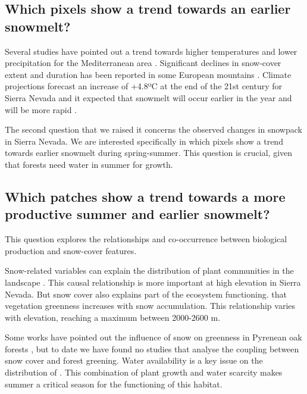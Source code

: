 \subsection{Which pixels show a trend towards an earlier snowmelt?}\label{sec:onto:Snowmelt}

Several studies have pointed out a trend towards higher temperatures and lower precipitation for the Mediterranean area \autocite{GarciaRuizetal2011MediterraneanWater,GiorgiLionello2008ClimateChange}. Significant declines in snow-cover extent and duration has been reported in some European mountains \autocite{Marty2008RegimeShift,MorenoRodriguezetal2005EvaluacionPreliminar,Nikolovaetal2013ChangesSnowfall,Scherreretal2004TrendsSwiss}. Climate projections forecast an increase of +4.8ºC at the end of the 21st century \autocite{Benitoetal2011SimulatingPotential} for Sierra Nevada and it expected that snowmelt will occur earlier in the year and will be more rapid \autocite{GarciaRuizetal2011MediterraneanWater}.

The second question that we raised it concerns the observed changes in snowpack in Sierra Nevada. We are interested specifically in which pixels show a trend towards earlier snowmelt during spring-summer. This question is crucial, given that \Qp forests need water in summer for growth.

\subsection{Which \Qp patches show a trend towards a more productive summer and earlier snowmelt?}\label{sec:ontoProductive}

This question explores the relationships and co-occurrence between biological production and snow-cover features.

Snow-related variables can explain the distribution of plant communities in the landscape \autocite{Jonesetal2001SnowEcology}. This causal relationship is more important at high elevation \autocite{BonetGarciaCayuela2009SeguimientoCubierta} in Sierra Nevada. But snow cover also explains part of the ecosystem functioning. \textcite{Trujilloetal2012ElevationdependentInfluence} that vegetation greenness increases with snow accumulation. This relationship varies with elevation, reaching a maximum between 2000-2600 m.

Some works have pointed out the influence of snow on greenness in Pyrenean oak forests \autocite{AlcarazSeguraetal2009BaselineCharacterization,Dionisioetal2012SatelliteBasedMonitoring}, but to date we have found no studies that analyse the coupling between snow cover and forest greening. Water availability is a key issue on the distribution of \Qp \autocite{delRioetal2007BioclimaticAnalysis,Gavilanetal2007ModellingCurrent}. This combination of plant growth and water scarcity makes summer a critical season for the functioning of this habitat.

